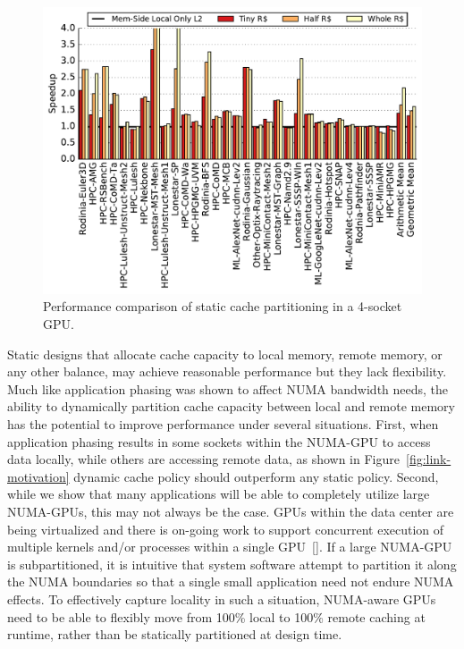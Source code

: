 \begin{figure}[t]
    \centering
    \includegraphics[width=1.0\columnwidth]{figures/plot_static_cache_WB.pdf}
    \caption{Performance comparison of static cache partitioning in a 4-socket GPU.}
    \label{fig:staticcaching}
\end{figure}

Static designs that allocate cache capacity to local memory, remote memory, or any other balance,
 may achieve reasonable performance but they lack flexibility. Much
like application phasing was shown to affect NUMA bandwidth needs, the ability to
dynamically partition cache capacity between local and remote memory has the potential
to improve performance under several situations. First, when application phasing
results in some sockets within the NUMA-GPU to access data locally, while others
are accessing remote data, as shown in Figure~\ref{fig:link-motivation} dynamic
cache policy should outperform any static policy. Second, while we show that many
applications will be able to completely utilize large NUMA-GPUs, this may not always
be the case.  GPUs within the data center are being virtualized and there is on-going
work to support concurrent execution of multiple kernels and/or processes within a
single GPU~\ref{}. If a large NUMA-GPU is subpartitioned, it is intuitive that system
software attempt to partition it along the NUMA boundaries so that a single small
application need not endure NUMA effects.  To effectively capture locality in such
a situation, NUMA-aware GPUs need to be able to flexibly move from 100\% local to
100\% remote caching at runtime, rather than be statically partitioned at design time.

